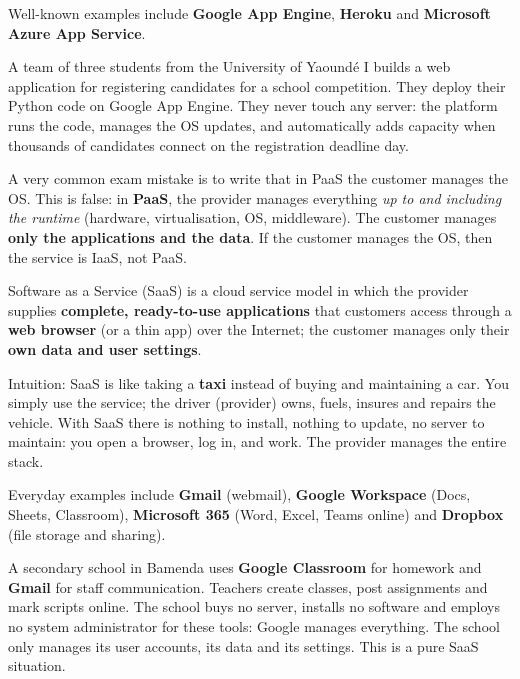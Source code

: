 \documentclass[11pt]{article}
\newcommand{\cle}[1]{{\popxbold\color{popdark}#1}}
\newcounter{popsec}
\newcounter{popsub}
\newcommand{\courssub}[1]{%
  \stepcounter{popsub}%
  \par\vspace{9pt}\noindent{\popxbold\fontsize{11.5}{13}\selectfont\color{popink}{\color{poporange}\thepopsec.\thepopsub}\hspace{6pt}#1}\par\nopagebreak\vspace{4pt}
}
\begin{document}
Well-known examples include \textbf{Google App Engine}, \textbf{Heroku} and \textbf{Microsoft Azure App Service}.

\begin{exemplebox}
A team of three students from the University of Yaound\'e I builds a web application for registering candidates for a school competition. They deploy their Python code on Google App Engine. They never touch any server: the platform runs the code, manages the OS updates, and automatically adds capacity when thousands of candidates connect on the registration deadline day.
\end{exemplebox}

\begin{attention}
A very common exam mistake is to write that in PaaS the customer manages the OS. This is false: in \textbf{PaaS}, the provider manages everything \emph{up to and including the runtime} (hardware, virtualisation, OS, middleware). The customer manages \textbf{only the applications and the data}. If the customer manages the OS, then the service is IaaS, not PaaS.
\end{attention}

\courssub{SaaS --- Software as a Service}

\begin{definition}[SaaS]
\cle{Software as a Service (SaaS)} is a cloud service model in which the provider supplies \textbf{complete, ready-to-use applications} that customers access through a \textbf{web browser} (or a thin app) over the Internet; the customer manages only their \textbf{own data and user settings}.
\end{definition}

Intuition: SaaS is like taking a \textbf{taxi} instead of buying and maintaining a car. You simply use the service; the driver (provider) owns, fuels, insures and repairs the vehicle. With SaaS there is nothing to install, nothing to update, no server to maintain: you open a browser, log in, and work. The provider manages the entire stack.

Everyday examples include \textbf{Gmail} (webmail), \textbf{Google Workspace} (Docs, Sheets, Classroom), \textbf{Microsoft 365} (Word, Excel, Teams online) and \textbf{Dropbox} (file storage and sharing).

\begin{exemplebox}
A secondary school in Bamenda uses \textbf{Google Classroom} for homework and \textbf{Gmail} for staff communication. Teachers create classes, post assignments and mark scripts online. The school buys no server, installs no software and employs no system administrator for these tools: Google manages everything. The school only manages its user accounts, its data and its settings. This is a pure SaaS situation.
\end{exemplebox}
\end{document}
